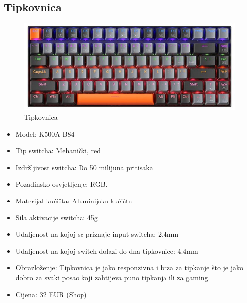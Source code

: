 \documentclass{article}
\begin{document}
\subsection{Tipkovnica}
\begin{figure}[H]
    \centering
    \includegraphics[width = \textwidth]{Slike/Tipkovnica..jpg}
    \caption{Tipkovnica}
    \label{fig:Tipkovnica}
\end{figure}
\begin{itemize}
    \item Model: K500A-B84
    \item Tip switcha: Mehanički, red
    \item Izdržljivost switcha: Do 50 milijuna pritisaka
    \item Pozadinsko osvjetljenje: RGB.
    \item Materijal kućišta: Aluminijsko kućište
    \item Sila aktivacije switcha: 45g
    \item Udaljenost na kojoj se priznaje input switcha: 2.4mm
    \item Udaljenost na kojoj switch dolazi do dna tipkovnice: 4.4mm
    \item Obrazloženje: Tipkovnica je jako responzivna i brza za tipkanje što je jako dobro za svaki posao koji zahtijeva puno tipkanja ili za gaming.
    \item Cijena: 32 EUR (\href{https://www.aliexpress.com/item/1005005958708733.html?spm=a2g0o.order_list.order_list_main.5.51111802yyqjTU}{Shop})
\end{itemize}
\end{document}
